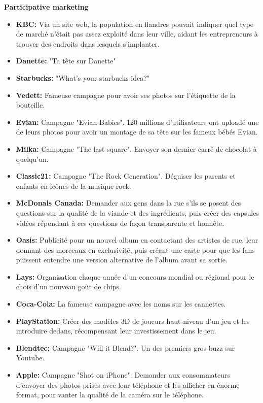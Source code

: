 \textbf{Participative marketing}

\begin{itemize}
    \item \textbf{KBC:} Via un site web, la population en flandres pouvait indiquer quel type de marché n'était pas assez exploité dans leur ville, aidant les entrepreneurs à trouver des endroits dans lesquels s'implanter.
    \item \textbf{Danette:} "Ta tête sur Danette"
    \item \textbf{Starbucks:} "What's your starbucks idea?"
    \item \textbf{Vedett:} Fameuse campagne pour avoir ses photos sur l'étiquette de la bouteille.
    \item \textbf{Evian:} Campagne "Evian Babies". 120 millions d'utilisateurs ont uploadé une de leurs photos pour avoir un montage de sa tête sur les fameux bébés Evian.
    \item \textbf{Milka:} Campagne "The last square". Envoyer son dernier carré de chocolat à quelqu'un.
    \item \textbf{Classic21:} Campagne "The Rock Generation". Déguiser les parents et enfants en icônes de la musique rock.
    \item \textbf{McDonals Canada:} Demander aux gens dans la rue s'ils se posent des questions sur la qualité de la viande et des ingrédients, puis créer des capsules vidéos répondant à ces questions de façon transparente et honnête.
    \item \textbf{Oasis:} Publicité pour un nouvel album en contactant des artistes de rue, leur donnant des morceaux en exclusivité, puis créant une carte pour que les fans puissent entendre une version alternative de l'album avant sa sortie.
    \item \textbf{Lays:} Organisation chaque année d'un concours mondial ou régional pour le chois d'un nouveau goût de chips.
    \item \textbf{Coca-Cola:} La fameuse campagne avec les noms sur les cannettes.
    \item \textbf{PlayStation:} Créer des modèles 3D de joueurs haut-niveau d'un jeu et les introduire dedans, récompensant leur investissement dans le jeu.
    \item \textbf{Blendtec:} Campagne "Will it Blend?". Un des premiers gros buzz sur Youtube.
    \item \textbf{Apple:} Campagne "Shot on iPhone". Demander aux consommateurs d'envoyer des photos prises avec leur téléphone et les afficher en énorme format, pour vanter la qualité de la caméra sur le téléphone.\\
\end{itemize}
